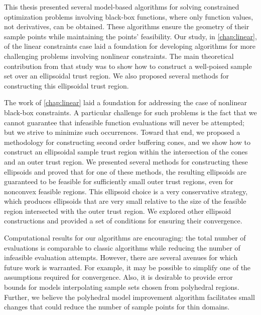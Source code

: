 This thesis presented several model-based algorithms for solving constrained optimization problems involving black-box functions, 
where only function values, not derivatives, can be obtained.
These algorithms ensure the geometry of their sample points while maintaining the points' feasibility.
Our study, in \cref{chap:linear}, of the linear constraints case laid a foundation for developing algorithms for more
challenging problems involving nonlinear constraints.  
The main theoretical contribution from that study was to show how to construct a well-poised sample set over an ellipsoidal trust region.
We also proposed several methods for constructing this ellipsoidal trust region.

The work of \cref{chap:linear} laid a foundation for addressing the case of nonlinear black-box constraints.
A particular challenge for such problems is the fact that we cannot guarantee that infeasible function evaluations will never be attempted;
but we strive to minimize such occurrences.
Toward that end, we proposed a methodology for constructing second order buffering cones, 
and we show how to construct an ellipsoidal sample trust region within the intersection of the cones and an outer trust region.
We presented several methods for constructing these ellipsoids and proved that for one of these methods,
the resulting ellipsoids are guaranteed to be feasible for sufficiently small outer trust regions, even for nonconvex feasible regions.
This ellipsoid choice is a very conservative strategy, 
which produces ellipsoids that are very small relative to the size of the feasible region intersected with the outer trust region.
We explored other ellipsoid constructions and provided a set of conditions for ensuring their convergence.

Computational results for our algorithms are encouraging: 
the total number of evaluations is comparable to classic algorithms while reducing the number of infeasible evaluation attempts.
However, there are several avenues for which future work is warranted.
For example, it may be possible to simplify one of the assumptions required for convergence.
Also, it is desirable to provide error bounds for models interpolating sample sets chosen from polyhedral regions.
Further, we believe the polyhedral model improvement algorithm facilitates small changes that could reduce the number of sample points for thin domains.



